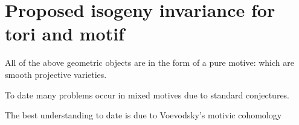 
\chapter{Proposed isogeny invariance for tori and motif}
\label{chap1}

\tab
All of the above geometric objects are in the form of a pure motive: which are smooth projective varieties.

To date many problems occur in mixed motives due to standard conjectures.

The best understanding to date is due to Voevodsky's motivic cohomology~\cite{MWV2006}

\endinput

Any text after an \endinput is ignored.
You could put scraps here or things in progress.
